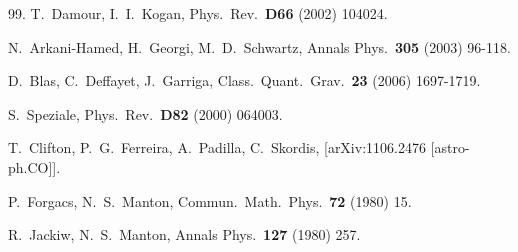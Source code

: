 \documentclass [prd,reprint,eqsecnum,nofootinbib]  {revtex4-1}
\begin{document}
\begin{thebibliography}{99.}
  T.~Damour, I.~I.~Kogan,
  Phys.\ Rev.\   {\bf D66 } (2002)  104024.

  N.~Arkani-Hamed, H.~Georgi, M.~D.~Schwartz,
  Annals Phys.\   {\bf 305 } (2003)  96-118.

  D.~Blas, C.~Deffayet, J.~Garriga,
  Class.\ Quant.\ Grav.\   {\bf 23 } (2006)  1697-1719.

  S.~Speziale,
  Phys.\ Rev.\   {\bf D82 } (2000)  064003.

  T.~Clifton, P.~G.~Ferreira, A.~Padilla, C.~Skordis,
  [arXiv:1106.2476 [astro-ph.CO]].

  P.~Forgacs, N.~S.~Manton,
  Commun.\ Math.\ Phys.\   {\bf 72 } (1980)  15.

  R.~Jackiw, N.~S.~Manton,
  Annals Phys.\   {\bf 127 } (1980)  257.

\end{thebibliography}
\end{document}
